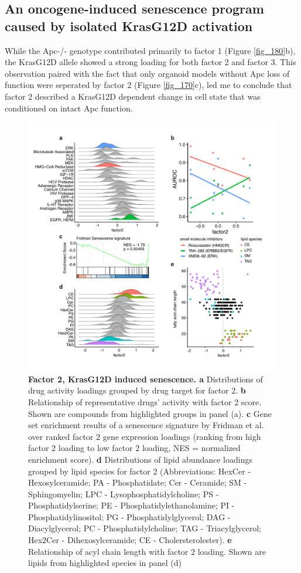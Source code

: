 \begin{flushleft}
\newpage

\section{An oncogene-induced senescence program caused by isolated KrasG12D activation}
While the Apc-/- genotype contributed primarily to factor 1 (Figure \ref{fig_180}b), the KrasG12D allele showed a strong loading for both factor 2 and factor 3. This observation paired with the fact that only organoid models without Apc loss of function were seperated by factor 2 (Figure \ref{fig_170}c), led me to conclude that factor 2 described a KrasG12D dependent change in cell state that was conditioned on intact Apc function.


\begin{figure}[h]
\centering
\includegraphics[scale=0.75,
                keepaspectratio]{figures/adenomaprofiling/pdf/fig_3_1.pdf}
\caption{\textbf{Factor 2, KrasG12D induced senescence. a} Distributions of drug activity loadings grouped by drug target for factor 2. \textbf{b} Relationship of representative drugs’ activity with factor 2 score. Shown are compounds from highlighted groups in panel (a). \textbf{c} Gene set enrichment results of a senescence signature by Fridman et al. over ranked factor 2 gene expression loadings (ranking from high factor 2 loading to low factor 2 loading, NES = normalized enrichment score). \textbf{d} Distributions of lipid abundance loadings grouped by lipid species for factor 2 (Abbreviations: HexCer - Hexosylceramide; PA - Phosphatidate; Cer - Ceramide; SM - Sphingomyelin; LPC - Lysophosphatidylcholine; PS - Phosphatidylserine; PE - Phosphatidylethanolamine; PI - Phosphatidylinositol; PG - Phosphatidylglycerol; DAG - Diacylglycerol; PC - Phosphatidylcholine; TAG - Triacylglycerol; Hex2Cer - Dihexosylceramide; CE - Cholersterolester). \textbf{e} Relationship of acyl chain length with factor 2 loading. Shown are lipids from highlighted species in panel (d)}

\end{figure}
\end{flushleft}
